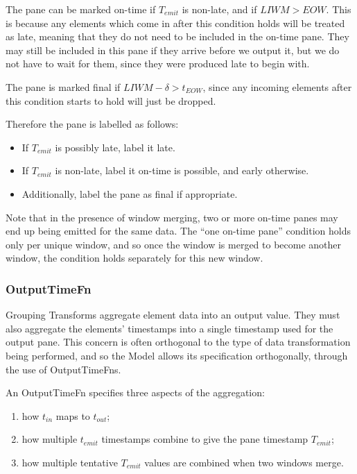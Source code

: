 The pane can be marked on-time if $T_{\mathit{emit}}$ is non-late, and if $\mathit{LIWM} > EOW$.
This is because any elements which come in after this condition holds will be treated as late, meaning that they do not need to be included in the on-time pane.
They may still be included in this pane if they arrive before we output it, but we do not have to wait for them, since they were produced late to begin with.

The pane is marked final if $\mathit{LIWM} - \delta > t_{\mathit{EOW}}$, since any incoming elements after this condition starts to hold will just be dropped.

Therefore the pane is labelled as follows:
\begin{itemize}
	\item If $T_{\mathit{emit}}$ is possibly late, label it late.
	\item If $T_{\mathit{emit}}$ is non-late, label it on-time is possible, and early otherwise.\footnotemark
	\item Additionally, label the pane as final if appropriate.
\end{itemize}

\footnotetext
{
Note that in the presence of window merging, two or more on-time panes may end up being emitted for the same data.
The ``one on-time pane'' condition holds only per unique window, and so once the window is merged to become another window, the condition holds separately for this new window.
}

\subsubsection{OutputTimeFn}
Grouping Transforms aggregate element data into an output value.
They must also aggregate the elements' timestamps into a single timestamp used for the output pane.
This concern is often orthogonal to the type of data transformation being performed, and so the Model allows its specification orthogonally, through the use of OutputTimeFns.

An OutputTimeFn specifies three aspects of the aggregation:
\begin{enumerate}
	\item how $t_{\mathit{in}}$ maps to $t_{\mathit{out}}$;
	\item how multiple $t_{\mathit{emit}}$ timestamps combine to give the pane timestamp $T_{\mathit{emit}}$;
	\item how multiple tentative $T_{\mathit{emit}}$ values are combined when two windows merge.
\end{enumerate}

